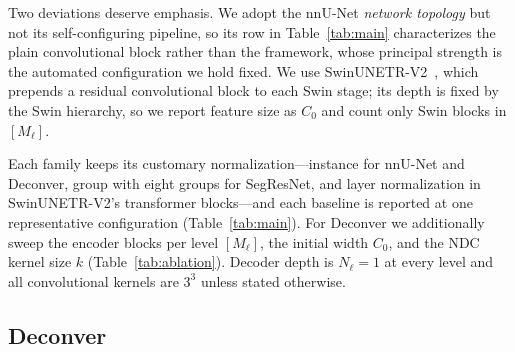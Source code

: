\documentclass[runningheads,a4paper]{llncs}
\begin{document}
Two deviations deserve emphasis. We adopt the nnU-Net \emph{network topology} but not its self-configuring pipeline, so its row in Table~\ref{tab:main} characterizes the plain convolutional block rather than the framework, whose principal strength is the automated configuration we hold fixed. We use SwinUNETR-V2~\cite{he2023swinunetrv2}, which prepends a residual convolutional block to each Swin stage; its depth is fixed by the Swin hierarchy, so we report feature size as $C_0$ and count only Swin blocks in $[M_\ell]$.

Each family keeps its customary normalization---instance for nnU-Net and Deconver, group with eight groups for SegResNet, and layer normalization in SwinUNETR-V2's transformer blocks---and each baseline is reported at one representative configuration (Table~\ref{tab:main}). For Deconver we additionally sweep the encoder blocks per level $[M_\ell]$, the initial width $C_0$, and the NDC kernel size $k$ (Table~\ref{tab:ablation}). Decoder depth is $N_\ell{=}1$ at every level and all convolutional kernels are $3^3$ unless stated otherwise.

\subsection{Deconver}
\label{sec:deconver}
\end{document}
